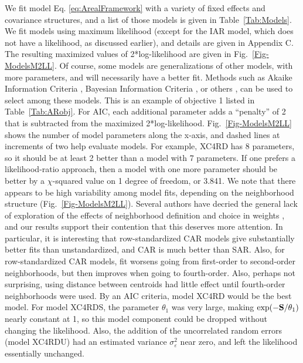 \documentclass[11pt, titlepage]{article}\usepackage[]{graphicx}\usepackage[]{color}
\begin{document}
\begin{spacing}{1.9}
\begin{flushleft}
We fit model Eq. \ref{eq:ArealFramework} with a variety of fixed effects and covariance structures, and a list of those models is given in Table~\ref{Tab:Models}.  We fit models using maximum likelihood (except for the IAR model, which does not have a likelihood, as discussed earlier), and details are given in Appendix C. The resulting maximized values of 2*log-likelihood are given in Fig.~\ref{Fig-ModelsM2LL}. Of course, some models are generalizations of other models, with more parameters, and will necessarily have a better fit.  Methods such as Akaike Information Criteria \citep[AIC,][]{Akai:Info:1973}, Bayesian Information Criteria \citep[BIC,][]{Schw:esti:1978}, or others \citep[see, e.g.,][]{Burn:Ande:mode:2002,Hoot:Hobb:guid:2015}, can be used to select among these models. This is an example of objective 1 listed in Table~\ref{Tab:ARobj}. For AIC, each additional parameter adds a ``penalty'' of 2 that is subtracted from the maximized 2*log-likelihood.  Fig.~\ref{Fig-ModelsM2LL} shows the number of model parameters along the x-axis, and dashed lines at increments of two help evaluate models. For example, XC4RD has 8 parameters, so it should be at least 2 better than a model with 7 parameters.  If one prefers a likelihood-ratio approach, then a model with one more parameter should be better by a $\chi$-squared value on 1 degree of freedom, or 3.841. We note that there appears to be high variability among model fits, depending on the neighborhood structure (Fig.~\ref{Fig-ModelsM2LL}).  Several authors have decried the general lack of exploration of the effects of neighborhood definition and choice in weights \citep{Best:Cock:Benn:Wake:Elli:ecol:2001,Earn:Morg:Meng:Ryan:Summ:Bear:eval:2007}, and our results support their contention that this deserves more attention.  In particular, it is interesting that row-standardized CAR models give substantially better fits than unstandardized, and CAR is much better than SAR. Also, for row-standardized CAR models, fit worsens going from first-order to second-order neighborhoods, but then improves when going to fourth-order.  Also, perhaps not surprising, using distance between centroids had little effect until fourth-order neighborhoods were used.  By an AIC criteria, model XC4RD would be the best model. For model XC4RDS, the parameter $\theta_1$ was very large, making $\exp(-\mathbf{S}/\theta_1)$ nearly constant at 1, so this model component could be dropped without changing the likelihood.  Also, the addition of the uncorrelated random errors (model XC4RDU) had an estimated variance $\sigma_\varepsilon^2$ near zero, and left the likelihood essentially unchanged. 


\end{flushleft}
\end{spacing}
\end{document}
